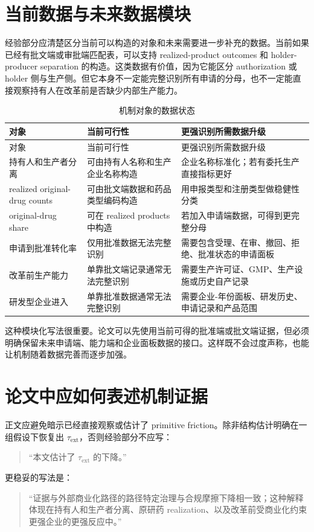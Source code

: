 \documentclass[12pt]{article}
\newcommand{\tauext}{\tau_{\mathrm{ext}}}
\begin{document}
\section{当前数据与未来数据模块}

经验部分应清楚区分当前可以构造的对象和未来需要进一步补充的数据。当前如果已经有批文端或审批端匹配表，可以支持 realized-product outcomes 和 holder-producer separation 的构造。这类数据有价值，因为它能区分 authorization 或 holder 侧与生产侧。但它本身不一定能完整识别所有申请的分母，也不一定能直接观察持有人在改革前是否缺少内部生产能力。

\begin{longtable}{p{}p{}p{}}
\caption{机制对象的数据状态}\label{tab:data_status_cn}\\
\toprule
对象 & 当前可行性 & 更强识别所需数据升级 \\
\midrule
\endfirsthead
\toprule
对象 & 当前可行性 & 更强识别所需数据升级 \\
\midrule
\endhead
持有人和生产者分离 & 可由持有人名称和生产企业名称构造 & 企业名称标准化；若有委托生产直接指标更好 \\
\addlinespace
realized original-drug counts & 可由批文端数据和药品类型编码构造 & 用申报类型和注册类型做稳健性分类 \\
\addlinespace
original-drug share & 可在 realized products 中构造 & 若加入申请端数据，可得到更完整分母 \\
\addlinespace
申请到批准转化率 & 仅用批准数据无法完整识别 & 需要包含受理、在审、撤回、拒绝、批准状态的申请面板 \\
\addlinespace
改革前生产能力 & 单靠批文端记录通常无法完整识别 & 需要生产许可证、GMP、生产设施或历史自产记录 \\
\addlinespace
研发型企业进入 & 单靠批准数据通常无法完整识别 & 需要企业-年份面板、研发历史、申请记录和产品范围 \\
\bottomrule
\end{longtable}

这种模块化写法很重要。论文可以先使用当前可得的批准端或批文端证据，但必须明确保留未来申请端、能力端和企业面板数据的接口。这样既不会过度声称，也能让机制随着数据完善而逐步加强。

\section{论文中应如何表述机制证据}

正文应避免暗示已经直接观察或估计了 primitive friction。除非结构估计明确在一组假设下恢复出 $\tauext$，否则经验部分不应写：
\begin{quote}
“本文估计了 $\tauext$ 的下降。”
\end{quote}
更稳妥的写法是：
\begin{quote}
“证据与外部商业化路径的路径特定治理与合规摩擦下降相一致；这种解释体现在持有人和生产者分离、原研药 realization、以及改革前受商业化约束更强企业的更强反应中。”
\end{quote}
\end{document}
